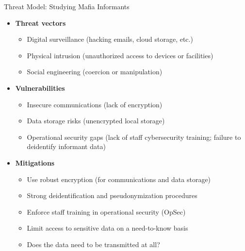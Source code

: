 \documentclass[aspectratio=169]{beamer}
\begin{document}
\begin{frame}{Threat Model: Studying Mafia Informants}
  \begin{itemize}
    \item[] \textbf{Threat vectors}
      \begin{itemize}
        \item Digital surveillance (hacking emails, cloud storage, etc.)
        \item Physical intrusion (unauthorized access to devices or facilities)
        \item Social engineering (coercion or manipulation)
      \end{itemize}
    \item[] \textbf{Vulnerabilities}
      \begin{itemize}
        \item Insecure communications (lack of encryption)
        \item Data storage risks (unencrypted local storage)
        \item Operational security gaps (lack of staff cybersecurity training; failure to deidentify informant data)
      \end{itemize}
    \item[] \textbf{Mitigations}
      \begin{itemize}
        \item Use robust encryption (for communications and data storage)
        \item Strong deidentification and pseudonymization procedures
        \item Enforce staff training in operational security (OpSec)
        \item Limit access to sensitive data on a need-to-know basis
        \item Does the data need to be transmitted at all?
      \end{itemize}
  \end{itemize}
\end{frame}
\end{document}

